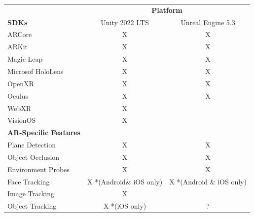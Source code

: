 \documentclass{vgtc}                          %
\begin{document}
\begin{table}[ht!]
	\centering

	\begin{tabular}{l c c}
		\toprule
		                              & \multicolumn{2}{c}{\textbf{Platform}}                            \\
		\cmidrule(l){2-3}
		\textbf{SDKs}                 & Unity 2022 LTS                        & Unreal Engine 5.3        \\
		\midrule
		ARCore                        & X                                     & X                        \\
		ARKit                         & X                                     & X                        \\
		Magic Leap                    & X                                     & X                        \\
		Microsof HoloLens             & X                                     & X                        \\
		OpenXR                        & X                                     & X                        \\
		Oculus                        & X                                     & X                        \\
		WebXR                         & X                                     &                          \\
		VisionOS                      & X                                     &                          \\
		\midrule
		\textbf{AR-Specific Features} &                                       &                          \\
		\midrule
		Plane Detection               & X                                     & X                        \\
		Object Occlusion              & X                                     & X                        \\
		Environment Probes            & X                                     & X                        \\
		Face Tracking                 & X *(Android\& iOS only)               & X *(Android \& iOS only) \\
		Image Tracking                & X                                     &                          \\
		Object Tracking               & X *(iOS only)                         & ?                        \\

\end{tabular}
\end{table}
\end{document}
